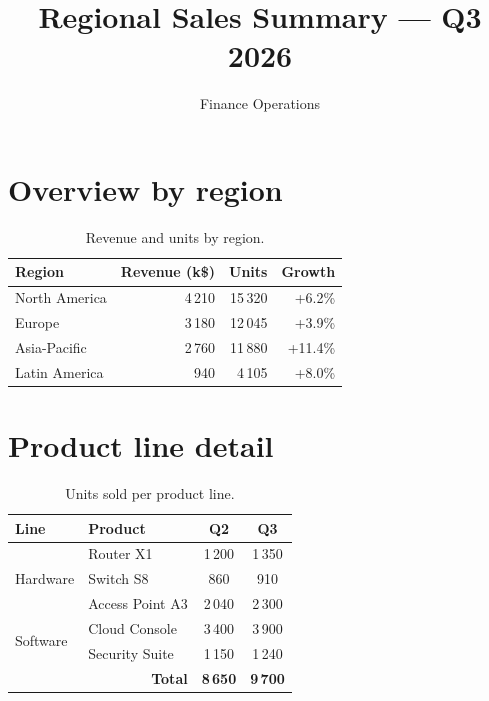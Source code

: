 \documentclass[11pt,a4paper]{article}
\title{Regional Sales Summary --- Q3 2026}
\author{Finance Operations}
\date{}
\begin{document}
\maketitle

\section{Overview by region}

\begin{table}[h]
\centering
{}
\begin{tabular}{l r r r}
\toprule
\rowcolor{gray!30}
\textbf{Region} & \textbf{Revenue (k\$)} & \textbf{Units} & \textbf{Growth} \\
\midrule
North America & 4\,210 & 15\,320 & +6.2\% \\
Europe        & 3\,180 & 12\,045 & +3.9\% \\
Asia-Pacific  & 2\,760 & 11\,880 & +11.4\% \\
Latin America & 940    & 4\,105  & +8.0\% \\
\bottomrule
\end{tabular}
\caption{Revenue and units by region.}
\end{table}

\section{Product line detail}

\begin{table}[h]
\centering
\begin{tabular}{|l|l|c|c|}
\hline
\textbf{Line} & \textbf{Product} & \textbf{Q2} & \textbf{Q3} \\ \hline
\multirow{3}{*}{Hardware} & Router X1 & 1\,200 & 1\,350 \\ \cline{2-4}
                          & Switch S8 & 860    & 910 \\ \cline{2-4}
                          & Access Point A3 & 2\,040 & 2\,300 \\ \hline
\multirow{2}{*}{Software} & Cloud Console & 3\,400 & 3\,900 \\ \cline{2-4}
                          & Security Suite & 1\,150 & 1\,240 \\ \hline
\multicolumn{2}{|r|}{\textbf{Total}} & \textbf{8\,650} & \textbf{9\,700} \\ \hline
\end{tabular}
\caption{Units sold per product line.}
\end{table}
\end{document}
